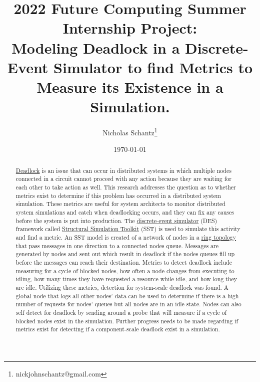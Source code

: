 \documentclass{article}
\begin{document}
%
%
%

    \begin{minipage}[h]{\textwidth}
        \title{2022 Future Computing Summer Internship Project:\\Modeling Deadlock in a Discrete-Event Simulator to find Metrics to Measure its Existence in a Simulation.}
        \author{Nicholas Schantz\footnote{nickjohnschantz@gmail.com}}
        \date{\today}
            \maketitle
        \begin{abstract}
            \href{https://en.wikipedia.org/wiki/Deadlock}{Deadlock} is an issue that can occur in distributed systems in which multiple nodes connected in a circuit cannot proceed with any action because they are waiting for each other to take action as well. This research addresses the question as to whether metrics exist to determine if this problem has occurred in a distributed system simulation. These metrics are useful for system architects to monitor distributed system simulations and catch when deadlocking occurs, and they can fix any causes before the system is put into production. The \href{https://en.wikipedia.org/wiki/Discrete-event_simulation}{discrete-event simulator} (DES) framework called \href{http://sst-simulator.org/}{Structural Simulation Toolkit} (SST) is used to simulate this activity and find a metric. An SST model is created of a network of nodes in a \href{https://en.wikipedia.org/wiki/Ring_network}{ring topology} that pass messages in one direction to a connected nodes queue. Messages are generated by nodes and sent out which result in deadlock if the nodes queues fill up before the messages can reach their destination. Metrics to detect deadlock include measuring for a cycle of blocked nodes, how often a node changes from executing to idling, how many times they have requested a resource while idle, and how long they are idle. Utilizing these metrics, detection for system-scale deadlock was found. A global node that logs all other nodes' data can be used to determine if there is a high number of requests for nodes' queues but all nodes are in an idle state. Nodes can also self detect for deadlock by sending around a probe that will measure if a cycle of blocked nodes exist in the simulation. Further progress needs to be made regarding if metrics exist for detecting if a component-scale deadlock exist in a simulation.
            
        \end{abstract}
    \end{minipage}
\end{document}
